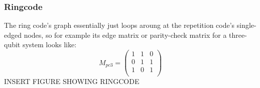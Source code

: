 \subsubsection{Ringcode}
The ring code's graph essentially just loops aroung at the repetition
code's single-edged nodes, so for example its edge matrix or parity-check
matrix for a three-qubit system looks like:
\begin{equation}
    M_{pc3} = \left(
        \begin{array}{ccc}
            1 & 1 & 0\\
            0 & 1 & 1\\
            1 & 0 & 1\\
        \end{array}
        \right)
\end{equation}
INSERT FIGURE SHOWING RINGCODE